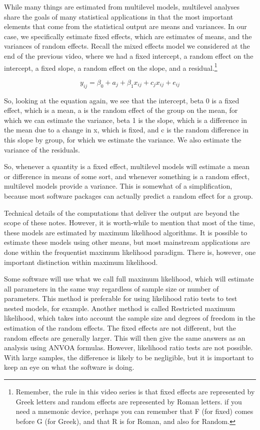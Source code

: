 While many things are estimated from multilevel models, multilevel analyses share the goals of many statistical applications in that the most important elements that come from the statistical output are means and variances. In our case, we specifically estimate fixed effects, which are estimates of means, and the variances of random effects. Recall the mixed effects model we considered at the end of the previous video, where we had a fixed intercept, a random effect on the intercept, a fixed slope, a random effect on the slope, and a residual.\footnote{Remember, the rule in this video series is that fixed effects are represented by Greek letters and random effects are represented by Roman letters. if you need a mnemonic device, perhaps you can remember that F (for fixed) comes before G (for Greek), and that R is for Roman, and also for Random.}

\[
y_{ij} = \beta_0+a_j+\beta_1x_{ij}+c_jx_{ij}+e_{ij}
\]

So, looking at the equation again, we see that the intercept, beta 0 is a fixed effect, which is a mean, a is the random effect of the group on the mean, for which we can estimate the variance, beta 1 is the slope, which is a difference in the mean due to a change in x, which is fixed, and c is the random difference in this slope by group, for which we estimate the variance. We also estimate the variance of the residuals.

So, whenever a quantity is a fixed effect, multilevel models will estimate a mean or difference in means of some sort, and whenever something is a random effect, multilevel models provide a variance. This is somewhat of a simplification, because most software packages can actually predict a random effect for a group.

Technical details of the computations that deliver the output are beyond the scope of these notes. However, it is worth-while to mention that most of the time, these models are estimated by maximum likelihood algorithms. It is possible to estimate these models using other means, but most mainstream applications are done within the frequentist maximum likelihood paradigm. There is, however, one important distinction within maximum likelihood.

Some software will use what we call full maximum likelihood, which will estimate all parameters in the same way regardless of sample size or number of parameters. This method is preferable for using likelihood ratio tests to test nested models, for example. Another method is called Restricted maximum likelihood, which takes into account the sample size and degrees of freedom in the estimation of the random effects.  The fixed effects are not different, but the random effects are generally larger. This will then give the same answers as an analysis using ANVOA formulas. However, likelihood ratio tests are not possible. With large samples, the difference is likely to be negligible, but it is important to keep an eye on what the software is doing.

